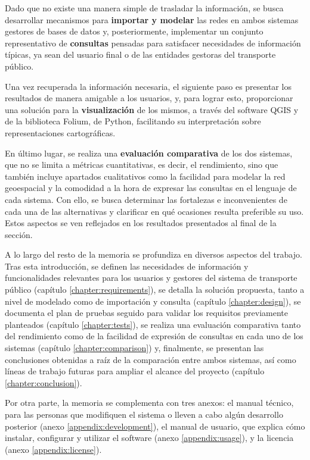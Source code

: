 Dado que no existe una manera simple de trasladar la información, se busca desarrollar mecanismos para \textbf{importar y modelar} las redes en ambos sistemas gestores de bases de datos y, posteriormente, implementar un conjunto representativo de \textbf{consultas} pensadas para satisfacer necesidades de información típicas, ya sean del usuario final o de las entidades gestoras del transporte público.

Una vez recuperada la información necesaria, el siguiente paso es presentar los resultados de manera amigable a los usuarios, y, para lograr esto, proporcionar una solución para la \textbf{visualización} de los mismos, a través del software QGIS y de la biblioteca Folium, de Python, facilitando su interpretación sobre representaciones cartográficas.

En último lugar, se realiza una \textbf{evaluación comparativa} de los dos sistemas, que no se limita a métricas cuantitativas, es decir, el rendimiento, sino que también incluye apartados cualitativos como la facilidad para modelar la red geoespacial y la comodidad a la hora de expresar las consultas en el lenguaje de cada sistema. Con ello, se busca determinar las fortalezas e inconvenientes de cada una de las alternativas y clarificar en qué ocasiones resulta preferible su uso. Estos aspectos se ven reflejados en los resultados presentados al final de la sección.

A lo largo del resto de la memoria se profundiza en diversos aspectos del trabajo. Tras esta introducción, se definen las necesidades de información y funcionalidades relevantes para los usuarios y gestores del sistema de transporte público (capítulo \ref{chapter:requirements}), se detalla la solución propuesta, tanto a nivel de modelado como de importación y consulta (capítulo \ref{chapter:design}), se documenta el plan de pruebas seguido para validar los requisitos previamente planteados (capítulo \ref{chapter:tests}), se realiza una evaluación comparativa tanto del rendimiento como de la facilidad de expresión de consultas en cada uno de los sistemas (capítulo \ref{chapter:comparison}) y, finalmente, se presentan las conclusiones obtenidas a raíz de la comparación entre ambos sistemas, así como líneas de trabajo futuras para ampliar el alcance del proyecto (capítulo \ref{chapter:conclusion}).

Por otra parte, la memoria se complementa con tres anexos: el manual técnico, para las personas que modifiquen el sistema o lleven a cabo algún desarrollo posterior (anexo \ref{appendix:development}), el manual de usuario, que explica cómo instalar, configurar y utilizar el software (anexo \ref{appendix:usage}), y la licencia (anexo \ref{appendix:license}).
